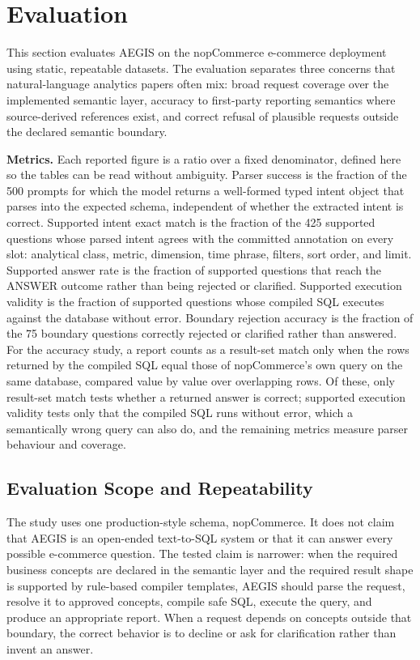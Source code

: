 \documentclass[pdflatex,sn-mathphys-num]{sn-jnl}
\begin{document}
\FloatBarrier
\section{Evaluation}

This section evaluates AEGIS on the nopCommerce e-commerce deployment using static, repeatable datasets. The evaluation separates three concerns that natural-language analytics papers often mix: broad request coverage over the implemented semantic layer, accuracy to first-party reporting semantics where source-derived references exist, and correct refusal of plausible requests outside the declared semantic boundary.


\textbf{Metrics.} Each reported figure is a ratio over a fixed denominator, defined here so the tables can be read without ambiguity. Parser success is the fraction of the 500 prompts for which the model returns a well-formed typed intent object that parses into the expected schema, independent of whether the extracted intent is correct. Supported intent exact match is the fraction of the 425 supported questions whose parsed intent agrees with the committed annotation on every slot: analytical class, metric, dimension, time phrase, filters, sort order, and limit. Supported answer rate is the fraction of supported questions that reach the ANSWER outcome rather than being rejected or clarified. Supported execution validity is the fraction of supported questions whose compiled SQL executes against the database without error. Boundary rejection accuracy is the fraction of the 75 boundary questions correctly rejected or clarified rather than answered. For the accuracy study, a report counts as a result-set match only when the rows returned by the compiled SQL equal those of nopCommerce's own query on the same database, compared value by value over overlapping rows. Of these, only result-set match tests whether a returned answer is correct; supported execution validity tests only that the compiled SQL runs without error, which a semantically wrong query can also do, and the remaining metrics measure parser behaviour and coverage.


\subsection{Evaluation Scope and Repeatability}

The study uses one production-style schema, nopCommerce. It does not claim that AEGIS is an open-ended text-to-SQL system or that it can answer every possible e-commerce question. The tested claim is narrower: when the required business concepts are declared in the semantic layer and the required result shape is supported by rule-based compiler templates, AEGIS should parse the request, resolve it to approved concepts, compile safe SQL, execute the query, and produce an appropriate report. When a request depends on concepts outside that boundary, the correct behavior is to decline or ask for clarification rather than invent an answer.
\end{document}
